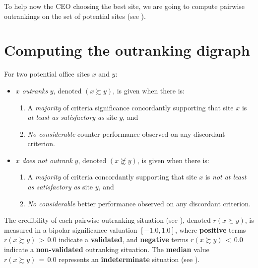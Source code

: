 To help now the CEO choosing the best site, we are going to compute pairwise outrankings on the set of potential sites (see \citet{BIS-2013}).

\section{Computing the outranking digraph}
\label{sec:6.2}

\begin{definition}
For two potential office sites $x$ and $y$:
\begin{itemize}
\item $x$ \emph{outranks} $y$, denoted $(x \succsim y)$, is given when there is:
   \begin{enumerate}
     \item A \emph{majority} of criteria significance concordantly supporting that site $x$ is \emph{at least as satisfactory as} site $y$, and
     \item \emph{No considerable} counter-performance observed on any discordant criterion.      
    \end{enumerate}
\item $x$ \emph{does not outrank} $y$, denoted $(x \not\succsim y)$, is given when there is:
   \begin{enumerate}
    \item A \emph{majority} of criteria concordantly supporting that site $x$ is \emph{not at least as satisfactory as} site $y$, and
    \item \emph{No considerable} better performance observed on any discordant criterion.
    \end{enumerate}
\end{itemize}
\end{definition}
The credibility of each pairwise outranking situation (see \citet{BIS-2013}), denoted $r(x \succsim y)$, is measured in a bipolar significance valuation $[-1.0, 1.0]$, where \textbf{positive} terms $r(x \succsim y)\, >\, 0.0$ indicate a \textbf{validated}, and \textbf{negative} terms $r(x \succsim y)\, <\, 0.0$ indicate a \textbf{non-validated} outranking situation. The \textbf{median} value $r(x \succsim y)\, = \,0.0$ represents an \textbf{indeterminate} situation (see \citet{BIS-2004a}).   

